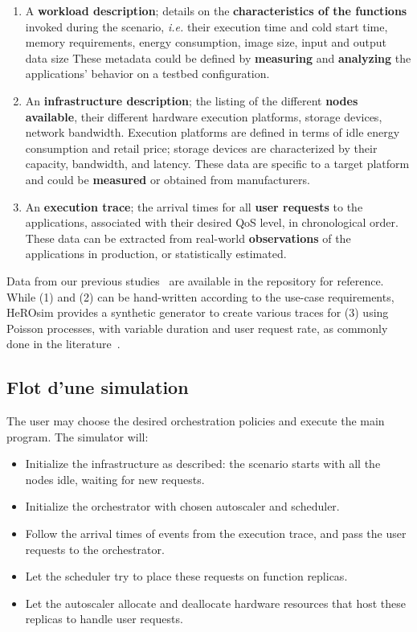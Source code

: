 \begin{enumerate}
    \item A \textbf{workload description}; details on the \textbf{characteristics of the functions}  invoked during the scenario, \textit{i.e.} their execution time and cold start time, memory requirements, energy consumption, image size, input and output data size These metadata could be defined by \textbf{measuring} and \textbf{analyzing} the applications' behavior on a testbed configuration. %
    \item An \textbf{infrastructure description}; the listing of the different \textbf{nodes available}, their different hardware execution platforms, storage devices, network bandwidth. Execution platforms are defined in terms of idle energy consumption and retail price; storage devices are characterized by their capacity, bandwidth, and latency. These data are specific to a target platform and could be \textbf{measured} or obtained from manufacturers.
    \item An \textbf{execution trace}; the arrival times for all \textbf{user requests} to the applications, associated with their desired QoS level, in chronological order. These data can be extracted from real-world \textbf{observations} of the applications in production, or statistically estimated. %
\end{enumerate}

Data from our previous studies~\cite{herofake, herocache} are available in the repository for reference. While (1) and (2) can be hand-written according to the use-case requirements, HeROsim provides a synthetic generator to create various traces for (3) using Poisson processes, with variable duration and user request rate, as commonly done in the literature~\cite{herocache}. 

\subsection{Flot d'une simulation}

The user may choose the desired orchestration policies and execute the main program. The simulator will:

\begin{itemize}
    \item Initialize the infrastructure as described: the scenario starts with all the nodes idle, waiting for new requests.
    \item Initialize the orchestrator with chosen autoscaler and scheduler.
    \item Follow the arrival times of events from the execution trace, and pass the user requests to the orchestrator.
    \item Let the scheduler try to place these requests on function replicas.
    \item Let the autoscaler allocate and deallocate hardware resources that host these replicas to handle user requests.
\end{itemize}


